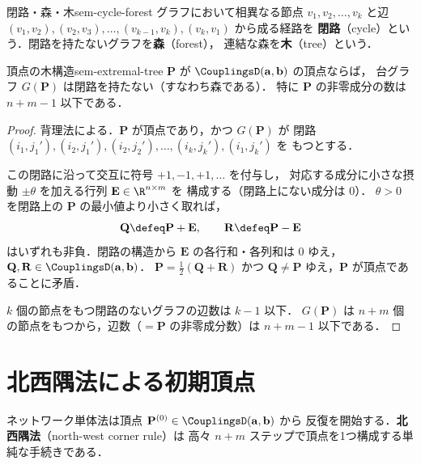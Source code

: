 \begin{definition}{閉路・森・木}{sem-cycle-forest}
  グラフにおいて相異なる節点 $v_1, v_2, \ldots, v_k$ と辺
  $(v_1, v_2), (v_2, v_3), \ldots, (v_{k-1}, v_k), (v_k, v_1)$ から成る経路を
  \textbf{閉路}（cycle）という．閉路を持たないグラフを\textbf{森}（forest），
  連結な森を\textbf{木}（tree）という．
\end{definition}

\begin{proposition}{頂点の木構造}{sem-extremal-tree}
  $\mathbf{P}$ が $\CouplingsD(\mathbf{a}, \mathbf{b})$ の頂点ならば，
  台グラフ $G(\mathbf{P})$ は閉路を持たない（すなわち森である）．
  特に $\mathbf{P}$ の非零成分の数は $n + m - 1$ 以下である．
\end{proposition}

\begin{proof}
  背理法による．$\mathbf{P}$ が頂点であり，かつ $G(\mathbf{P})$ が
  閉路 $(i_1, j_1'), (i_2, j_1'), (i_2, j_2'), \ldots, (i_k, j_k'), (i_1, j_k')$ を
  もつとする．

  この閉路に沿って交互に符号 $+1, -1, +1, \ldots$ を付与し，
  対応する成分に小さな摂動 $\pm \theta$ を加える行列 $\mathbf{E} \in \R^{n \times m}$ を
  構成する（閉路上にない成分は $0$）．
  $\theta > 0$ を閉路上の $\mathbf{P}$ の最小値より小さく取れば，
  \[
    \mathbf{Q} \defeq \mathbf{P} + \mathbf{E},
    \qquad
    \mathbf{R} \defeq \mathbf{P} - \mathbf{E}
  \]
  はいずれも非負．閉路の構造から $\mathbf{E}$ の各行和・各列和は $0$ ゆえ，
  $\mathbf{Q}, \mathbf{R} \in \CouplingsD(\mathbf{a}, \mathbf{b})$．
  $\mathbf{P} = \tfrac{1}{2}(\mathbf{Q} + \mathbf{R})$
  かつ $\mathbf{Q} \neq \mathbf{P}$ ゆえ，$\mathbf{P}$ が頂点であることに矛盾．

  $k$ 個の節点をもつ閉路のないグラフの辺数は $k - 1$ 以下．
  $G(\mathbf{P})$ は $n + m$ 個の節点をもつから，辺数（$= \mathbf{P}$ の非零成分数）は
  $n + m - 1$ 以下である．
\end{proof}

\section{北西隅法による初期頂点}
\label{sec:sem-northwest}

ネットワーク単体法は頂点 $\mathbf{P}^{(0)} \in \CouplingsD(\mathbf{a}, \mathbf{b})$ から
反復を開始する．\textbf{北西隅法}（north-west corner rule）は
高々 $n + m$ ステップで頂点を1つ構成する単純な手続きである．

